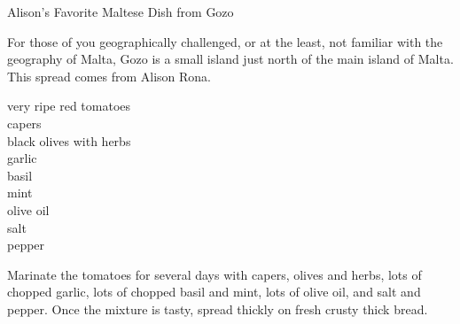 \begin{entry}{Alison's Favorite Maltese Dish from Gozo}

\begin{open}
  For those of you geographically challenged, or at the least, not familiar
  with the geography of Malta, Gozo is a small island just north of the main
  island of Malta.  This spread comes from Alison Rona.
\end{open}
\begin{ingredients}
    very ripe red tomatoes\\
    capers\\
    black olives with herbs\\
    garlic\\
    basil\\
    mint\\
    olive oil\\
    salt\\
    pepper
\end{ingredients}
Marinate the tomatoes for several days with capers, olives and herbs, lots of
chopped garlic, lots of chopped basil and mint, lots of olive oil, and salt
and pepper.  Once the mixture is tasty, spread thickly on fresh crusty thick
bread.
\end{entry}

